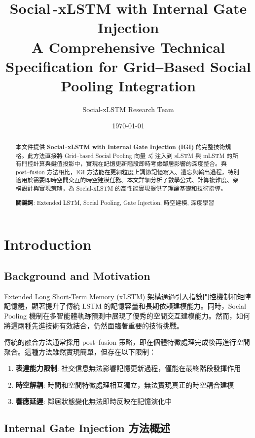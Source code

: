 \documentclass[11pt,a4paper]{article}
\title{Social\,-xLSTM with Internal Gate Injection\\
\vspace{0.4em}\Large A Comprehensive Technical Specification for Grid--Based Social Pooling Integration}
\author{Social-xLSTM Research Team}
\date{\today}
\begin{document}
\maketitle

\begin{abstract}
本文件提供 \textbf{Social\,-xLSTM with Internal Gate Injection (IGI)} 的完整技術規格。此方法直接將 Grid--based Social Pooling 向量 $S_t^i$ 注入到 sLSTM 與 mLSTM 的所有門控計算與鍵值投影中，實現在記憶更新階段即時考慮鄰居影響的深度整合。與 post--fusion 方法相比，IGI 方法能在更細粒度上調節記憶寫入、遺忘與輸出過程，特別適用於需要即時空間交互的時空建模任務。本文詳細分析了數學公式、計算複雜度、架構設計與實現策略，為 Social-xLSTM 的高性能實現提供了理論基礎和技術指導。

\textbf{關鍵詞}: Extended LSTM, Social Pooling, Gate Injection, 時空建模, 深度學習
\end{abstract}

\tableofcontents

\section{Introduction}

\subsection{Background and Motivation}

Extended Long Short-Term Memory (xLSTM) 架構通過引入指數門控機制和矩陣記憶體，顯著提升了傳統 LSTM 的記憶容量和長期依賴建模能力。同時，Social Pooling 機制在多智能體軌跡預測中展現了優秀的空間交互建模能力。然而，如何將這兩種先進技術有效結合，仍然面臨著重要的技術挑戰。

傳統的融合方法通常採用 post--fusion 策略，即在個體特徵處理完成後再進行空間聚合。這種方法雖然實現簡單，但存在以下限制：

\begin{enumerate}
\item \textbf{表達能力限制}: 社交信息無法影響記憶更新過程，僅能在最終階段發揮作用
\item \textbf{時空解耦}: 時間和空間特徵處理相互獨立，無法實現真正的時空耦合建模
\item \textbf{響應延遲}: 鄰居狀態變化無法即時反映在記憶演化中
\end{enumerate}

\subsection{Internal Gate Injection 方法概述}
\end{document}
